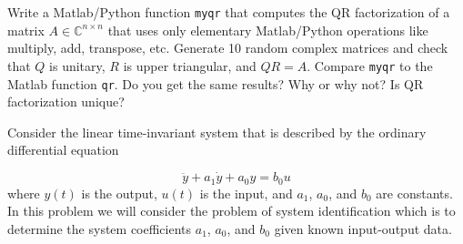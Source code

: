\documentclass{exam}
\begin{document}
  \begin{problem}
      Write a Matlab/Python function \texttt{myqr} that computes the QR factorization of a matrix $A \in \mathds{C}^{n\times n}$ that uses only elementary Matlab/Python operations like multiply, add, transpose, etc. Generate 10 random complex matrices and check that $Q$ is unitary, $R$ is upper triangular, and $QR = A$. Compare \texttt{myqr} to the Matlab function \texttt{qr}. Do you get the same results? Why or why not? Is QR factorization unique?
  \end{problem}

  \begin{solution}
      
  \end{solution}

  \begin{problem}
     Consider the linear time-invariant system that is described by the ordinary differential equation 

     \[
         \ddot{y} + a_1\dot{y} + a_0y = b_0u
     \]
     where $y(t)$ is the output, $u(t)$ is the input, and $a_1$, $a_0$, and $b_0$ are constants. In this problem we will consider the problem of system identification which is to determine the system coefficients $a_1$, $a_0$, and $b_0$ given known input-output data.
\end{problem}
\end{document}
